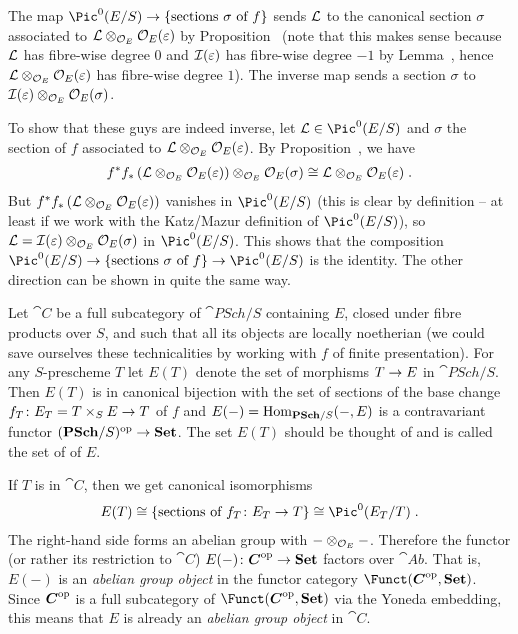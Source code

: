 \documentclass[a4paper,parskip=half,numbers=enddot, DIV=12]{scrreprt}
\begin{document}
	The map $\Pic^0(E/S)\morphism\{\text{sections }\sigma\text{ of }f\}$ sends $\mathcal{L}$ to the canonical section $\sigma$ associated to $\mathcal{L}\otimes_{\mathcal{O}_E}\mathcal{O}_E(\varepsilon)$ by Proposition~ (note that this makes sense because $\mathcal{L}$ has fibre-wise degree $0$ and $\mathcal{I}(\varepsilon)$ has fibre-wise degree $-1$ by Lemma~, hence $\mathcal{L}\otimes_{\mathcal{O}_E}\mathcal{O}_E(\varepsilon)$ has fibre-wise degree $1$). The inverse map sends a section $\sigma$ to $\mathcal{I}(\varepsilon)\otimes_{\mathcal{O}_E}\mathcal{O}_E(\sigma)$.
	
	To show that these guys are indeed inverse, let $\Ll\in\Pic^0(E/S)$ and $\sigma$ the section of $f$ associated to $\mathcal{L}\otimes_{\mathcal{O}_E}\mathcal{O}_E(\varepsilon)$. By Proposition~, we have
	\begin{align*}
		f^*f_*\left(\mathcal{L}\otimes_{\mathcal{O}_E}\mathcal{O}_E(\varepsilon)\right)\otimes_{\mathcal{O}_E}\mathcal{O}_E(\sigma)\cong\mathcal{L}\otimes_{\mathcal{O}_E}\mathcal{O}_E(\varepsilon)\;.
	\end{align*}
	But $f^*f_*\left(\mathcal{L}\otimes_{\mathcal{O}_E}\mathcal{O}_E(\varepsilon)\right)$ vanishes in $\Pic^0(E/S)$ (this is clear by definition -- at least if we work with the Katz/Mazur definition of $\Pic^0(E/S)$), so $\mathcal{L}=\mathcal{I}(\varepsilon)\otimes_{\mathcal{O}_E}\mathcal{O}_E(\sigma)$ in $\Pic^0(E/S)$. This shows that the composition $\Pic^0(E/S)\morphism\{\text{sections }\sigma\text{ of }f\}\morphism\Pic^0(E/S)$ is the identity. The other direction can be shown in quite the same way.
	
	Let $\cat C$ be a full subcategory of $\cat{PSch}/S$ containing $E$, closed under fibre products over $S$, and such that all its objects are locally noetherian (we could save ourselves these technicalities by working with $f$ of finite presentation). For any $S$-prescheme $T$ let $E(T)$ denote the set of morphisms $T\morphism E$ in $\cat{PSch}/S$. Then $E(T)$ is in canonical bijection with the set of sections of the base change $f_T\colon E_T=T\times_SE\morphism T$ of $f$ and $E(-)=\Hom_{\cat{PSch}/S}(-,E)$ is a contravariant functor $(\cat{PSch}/S)^\op\morphism\cat{Set}$. The set $E(T)$ should be thought of and is called the set of  of $E$.
	
	If $T$ is in $\cat C$, then we get canonical isomorphisms
	\begin{align*}
		E(T)\cong\left\{\text{sections of }f_T\colon E_T\to T\right\}\cong\Pic^0(E_T/T)\;.
	\end{align*}
	The right-hand side forms an abelian group with $-\otimes_{\mathcal{O}_E}-$. Therefore the functor (or rather its restriction to $\cat C$) $E(-)\colon \cat C^\op\morphism\cat{Set}$ factors over $\cat{Ab}$. That is, $E(-)$ is an \emph{abelian group object} in the functor category $\Funct(\cat{C}^\op,\cat{Set})$. Since $\cat C^\op$ is a full subcategory of $\Funct(\cat{C}^\op,\cat{Set})$ via the Yoneda embedding, this means that $E$ is already an \emph{abelian group object} in $\cat C$.
	
\end{document}
